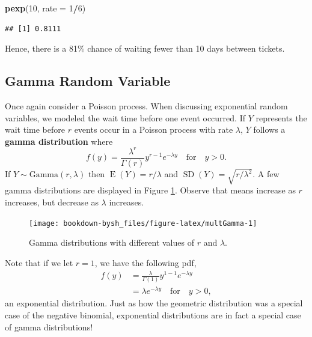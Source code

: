 \documentclass[
]{krantz}
\newenvironment{Shaded}{\begin{snugshade}}{\end{snugshade}}
\newcommand{\DataTypeTok}[1]{\textcolor[rgb]{0.27,0.27,0.27}{#1}}
\newcommand{\DecValTok}[1]{\textcolor[rgb]{0.06,0.06,0.06}{#1}}
\newcommand{\KeywordTok}[1]{\textcolor[rgb]{0.27,0.27,0.27}{\textbf{#1}}}
\newcommand{\NormalTok}[1]{#1}
\newcommand{\OperatorTok}[1]{\textcolor[rgb]{0.43,0.43,0.43}{\textbf{#1}}}
\newcommand{\E}{\operatorname{E}}
\newcommand{\SD}{\operatorname{SD}}
\begin{document}
\begin{Shaded}
\begin{Highlighting}[]
\KeywordTok{pexp}\NormalTok{(}\DecValTok{10}\NormalTok{, }\DataTypeTok{rate =} \DecValTok{1}\OperatorTok{/}\DecValTok{6}\NormalTok{)}
\end{Highlighting}
\end{Shaded}

\begin{verbatim}
## [1] 0.8111
\end{verbatim}

Hence, there is a 81\% chance of waiting fewer than 10 days between tickets.

\hypertarget{gamma-random-variable}{%
\subsection{Gamma Random Variable}\label{gamma-random-variable}}

Once again consider a Poisson process. When discussing exponential random variables, we modeled the wait time before one event occurred. If \(Y\) represents the wait time before \(r\) events occur in a Poisson process with rate \(\lambda\), \(Y\) follows a \textbf{gamma distribution} where
\begin{equation}
f(y) = \frac{\lambda^r}{\Gamma(r)} y^{r-1} e^{-\lambda y}\quad \textrm{for} \quad y >0.
\label{eq:gammaRV}
\end{equation}
If \(Y \sim \textrm{Gamma}(r, \lambda)\) then \(\E(Y) = r/\lambda\) and \(\SD(Y) = \sqrt{r/\lambda^2}\). A few gamma distributions are displayed in Figure \ref{fig:multGamma}. Observe that means increase as \(r\) increases, but decrease as \(\lambda\) increases.



\begin{figure}

{\centering \texttt{[image: bookdown-bysh\_files/figure-latex/multGamma-1]} 

}

\caption{Gamma distributions with different values of \(r\) and \(\lambda\).}\label{fig:multGamma}
\end{figure}

Note that if we let \(r = 1\), we have the following pdf,
\begin{align*}
 f(y) &= \frac{\lambda}{\Gamma(1)} y^{1-1} e^{-\lambda y} \\
      &= \lambda e^{-\lambda y} \quad \textrm{for} \quad y > 0,
\end{align*}
an exponential distribution. Just as how the geometric distribution was a special case of the negative binomial, exponential distributions are in fact a special case of gamma distributions!
\end{document}
